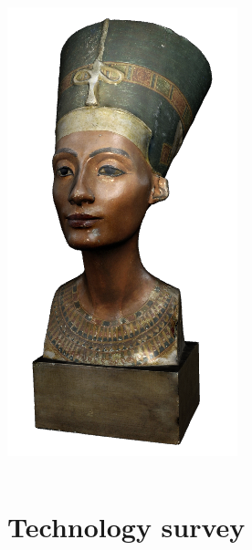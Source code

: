 \begin{frame}
\begin{columns}
\begin{column}{0.2\textwidth}
      \includegraphics[width=.9\textwidth]{images/nefertiti}
    \end{column}
  \end{columns}
\end{frame}

\section{Technology survey}

